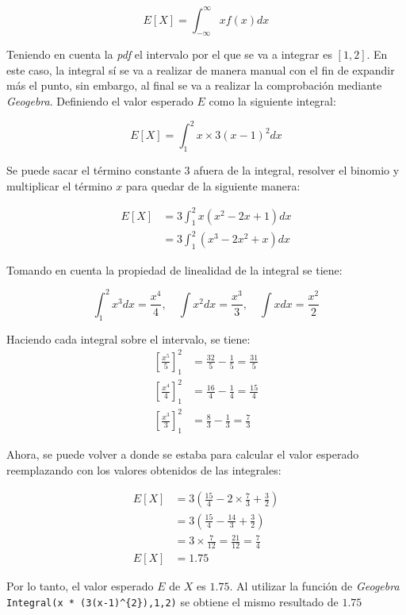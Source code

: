 \documentclass[12pt]{article}
\begin{document}
\[
  E[X] = \int_{-\infty}^{\infty} x f(x) dx
\]

Teniendo en cuenta la \textit{pdf} el intervalo por el que se va a integrar es $[1, 2]$. En este caso, la integral sí se va a realizar de manera manual con el fin de expandir más el punto, sin embargo, al final se va a realizar la comprobación mediante \textit{Geogebra}. Definiendo el valor esperado $E$ como la siguiente integral:

\[
E[X] = \int_{1}^{2} x \times 3(x - 1)^{2} dx
\]

Se puede sacar el término constante 3 afuera de la integral, resolver el binomio y multiplicar el término $x$ para quedar de la siguiente manera:

\begin{align*}
  E[X] &= 3 \int_{1}^{2} x(x^{2} - 2x + 1) dx \\
       &= 3 \int_{1}^{2} (x^{3} - 2x^{2} + x) dx 
\end{align*}

Tomando en cuenta la propiedad de linealidad de la integral se tiene:

\[
  \int_{1}^{2} x^{3} dx = \frac{x^{4}}{4}, \quad \int x^{2} dx = \frac{x^{3}}{3} , \quad \int xdx = \frac{x^{2}}{2}  
\]

Haciendo cada integral sobre el intervalo, se tiene:
\begin{align*}
  \left[\frac{x^{5}}{5} \right]_{1}^{2} &= \frac{32}{5} - \frac{1}{5} = \frac{31}{5} \\
  \left[\frac{x^{4}}{4} \right]_{1}^{2} &= \frac{16}{4} - \frac{1}{4} = \frac{15}{4}\\
  \left[\frac{x^{3}}{3} \right]_{1}^{2} &= \frac{8}{3} - \frac{1}{3} = \frac{7}{3}
\end{align*}

Ahora, se puede volver a donde se estaba para calcular el valor esperado reemplazando con los valores obtenidos de las integrales:

\begin{align*}
  E[X] &= 3 \left( \frac{15}{4} - 2 \times \frac{7}{3} + \frac{3}{2} \right) \\
       &= 3 \left( \frac{15}{4} - \frac{14}{3} + \frac{3}{2} \right) \\
       &= 3 \times \frac{7}{12} = \frac{21}{12} = \frac{7}{4} \\
  E[X] &= 1.75
\end{align*}

Por lo tanto, el valor esperado $E$ de $X$ es $1.75$. Al utilizar la función de \textit{Geogebra} \lstinline|Integral(x * (3(x-1)^{2}),1,2)| se obtiene el mismo resultado de $1.75$
\end{document}
